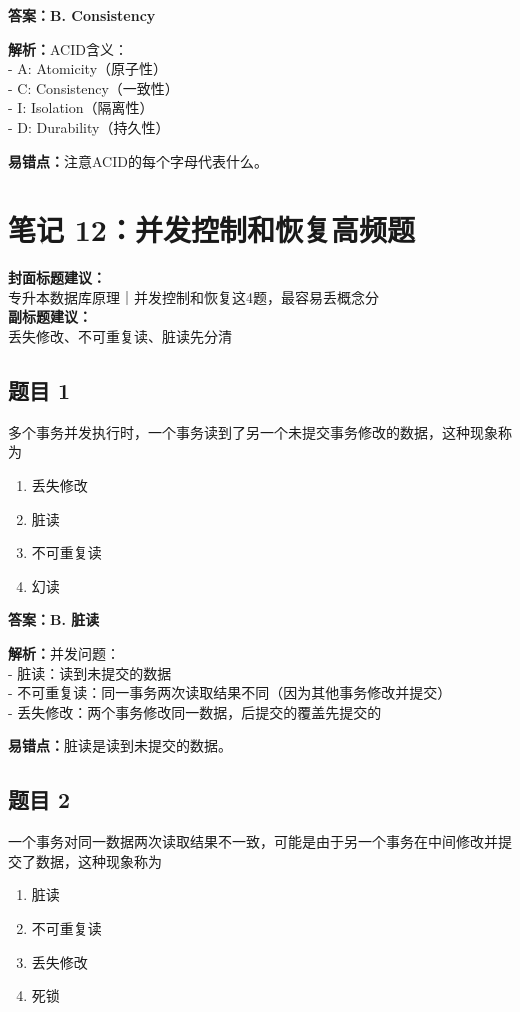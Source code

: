 \documentclass[12pt,a4paper]{ctexart}
\begin{document}
\begin{answerbox}
	\textbf{答案：B. Consistency}

	\textbf{解析：}ACID含义：\\
	- A: Atomicity（原子性）\\
	- C: Consistency（一致性）\\
	- I: Isolation（隔离性）\\
	- D: Durability（持久性）

	\textbf{易错点：}注意ACID的每个字母代表什么。
\end{answerbox}

\newpage

\section{笔记 12：并发控制和恢复高频题}
\begin{coverbox}
	\textbf{封面标题建议：}\\
	专升本数据库原理｜并发控制和恢复这4题，最容易丢概念分\\
	\textbf{副标题建议：}\\
	丢失修改、不可重复读、脏读先分清
\end{coverbox}

\subsection*{题目 1}
多个事务并发执行时，一个事务读到了另一个未提交事务修改的数据，这种现象称为
\begin{enumerate}[label=\Alph*.]
	\item 丢失修改
	\item 脏读
	\item 不可重复读
	\item 幻读
\end{enumerate}

\begin{answerbox}
	\textbf{答案：B. 脏读}

	\textbf{解析：}并发问题：\\
	- 脏读：读到未提交的数据\\
	- 不可重复读：同一事务两次读取结果不同（因为其他事务修改并提交）\\
	- 丢失修改：两个事务修改同一数据，后提交的覆盖先提交的

	\textbf{易错点：}脏读是读到未提交的数据。
\end{answerbox}

\subsection*{题目 2}
一个事务对同一数据两次读取结果不一致，可能是由于另一个事务在中间修改并提交了数据，这种现象称为
\begin{enumerate}[label=\Alph*.]
	\item 脏读
	\item 不可重复读
	\item 丢失修改
	\item 死锁
\end{enumerate}
\end{document}
